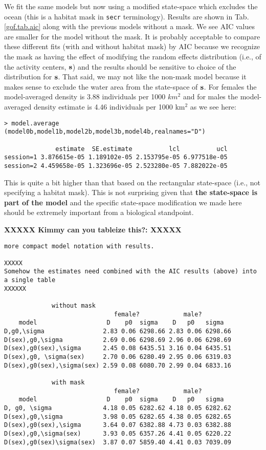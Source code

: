 We fit the same models but now using a modified state-space which
excludes the ocean (this is a habitat mask in \mbox{\tt secr}
terminology).  Results are shown in Tab. \ref{gof.tab.aic} along with
the previous models without a mask.  We see AIC values are smaller for
the model without the mask. It is probably acceptable to compare these
different fits (with and without habitat mask) by AIC because we
recognize the mask as having the effect of modifying the random
effects distribution (i.e., of the activity centers, ${\bf s}$) and
the results should be sensitive to choice of the distribution for
${\bf s}$. That said, we may not like the non-mask model because it
makes sense to exclude the water area from the state-space of ${\bf
  s}$.  For females the model-averaged density is 3.88 individuals per
1000 $km^2$ and for males the model-averaged density estimate is 4.46
individuals per 1000 km$^2$ as we see here:
{\small
\begin{verbatim}
> model.average (model0b,model1b,model2b,model3b,model4b,realnames="D")

              estimate  SE.estimate          lcl          ucl
session=1 3.876615e-05 1.189102e-05 2.153795e-05 6.977518e-05
session=2 4.459658e-05 1.323696e-05 2.523280e-05 7.882022e-05
\end{verbatim}
}
This is quite a bit higher than that based on the rectangular state-space
(i.e., not specifying a habitat mask). This is not surprising given
that {\bf the state-space is part of the model} and the specific
state-space modification we made here should be extremely important
from a biological standpoint.

{\bf XXXXX Kimmy can you tableize this?: XXXXX}
\begin{verbatim}
more compact model notation with results.

XXXXX
Somehow the estimates need combined with the AIC results (above) into
a single table
XXXXXX

             without mask
                              female?            male?
    model                   D    p0  sigma    D   p0   sigma
D,g0,\sigma                2.83 0.06 6298.66 2.83 0.06 6298.66
D(sex),g0,\sigma           2.69 0.06 6298.69 2.96 0.06 6298.69
D(sex),g0(sex),\sigma      2.45 0.08 6435.51 3.16 0.04 6435.51
D(sex),g0, \sigma(sex)     2.70 0.06 6280.49 2.95 0.06 6319.03
D(sex),g0(sex),\sigma(sex) 2.59 0.08 6080.70 2.99 0.04 6833.16

             with mask
                              female?            male?
    model                   D    p0  sigma    D   p0   sigma
D, g0, \sigma              4.18 0.05 6282.62 4.18 0.05 6282.62
D(sex),g0,\sigma           3.98 0.05 6282.65 4.38 0.05 6282.65
D(sex),g0(sex),\sigma      3.64 0.07 6382.88 4.73 0.03 6382.88
D(sex),g0,\sigma(sex)      3.93 0.05 6357.26 4.41 0.05 6220.22
D(sex),g0(sex)\sigma(sex)  3.87 0.07 5859.40 4.41 0.03 7039.09
\end{verbatim}





